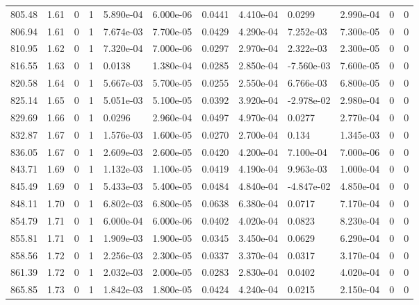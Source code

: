 \documentclass[preview]{standalone}
\begin{document}
{{{{{{{{{{{{{{{{{{\begin{tabular}{L{1.2cm}C{1.2cm} C{0.3cm}C{0.5cm} C{1.4cm}C{1.4cm} C{1.4cm}C{1.4cm} C{1.6cm}C{1.6cm} C{1.6cm}C{1.6cm}}
  805.48  &  1.61  & 0     &  1 &  5.890e-04  & 6.000e-06  &  0.0441&   4.410e-04& 0.0299 & 2.990e-04   &  0 & 0  \\ 
  806.94  &  1.61  & 0     &  1 &  7.674e-03  & 7.700e-05  &  0.0429&   4.290e-04& 7.252e-03 & 7.300e-05   &  0 & 0  \\ 
  810.95  &  1.62  & 0     &  1 &  7.320e-04  & 7.000e-06  &  0.0297&   2.970e-04& 2.322e-03 & 2.300e-05   &  0 & 0  \\ 
  816.55  &  1.63  & 0     &  1 &  0.0138  & 1.380e-04  &  0.0285&   2.850e-04& -7.560e-03 & 7.600e-05   &  0 & 0  \\ 
  820.58  &  1.64  & 0     &  1 &  5.667e-03  & 5.700e-05  &  0.0255&   2.550e-04& 6.766e-03 & 6.800e-05   &  0 & 0  \\ 
  825.14  &  1.65  & 0     &  1 &  5.051e-03  & 5.100e-05  &  0.0392&   3.920e-04& -2.978e-02 & 2.980e-04   &  0 & 0  \\ 
  829.69  &  1.66  & 0     &  1 &  0.0296  & 2.960e-04  &  0.0497&   4.970e-04& 0.0277 & 2.770e-04   &  0 & 0  \\ 
  832.87  &  1.67  & 0     &  1 &  1.576e-03  & 1.600e-05  &  0.0270&   2.700e-04& 0.134 & 1.345e-03   &  0 & 0  \\ 
  836.05  &  1.67  & 0     &  1 &  2.609e-03  & 2.600e-05  &  0.0420&   4.200e-04& 7.100e-04 & 7.000e-06   &  0 & 0  \\ 
  843.71  &  1.69  & 0     &  1 &  1.132e-03  & 1.100e-05  &  0.0419&   4.190e-04& 9.963e-03 & 1.000e-04   &  0 & 0  \\ 
  845.49  &  1.69  & 0     &  1 &  5.433e-03  & 5.400e-05  &  0.0484&   4.840e-04& -4.847e-02 & 4.850e-04   &  0 & 0  \\ 
  848.11  &  1.70  & 0     &  1 &  6.802e-03  & 6.800e-05  &  0.0638&   6.380e-04& 0.0717 & 7.170e-04   &  0 & 0  \\ 
  854.79  &  1.71  & 0     &  1 &  6.000e-04  & 6.000e-06  &  0.0402&   4.020e-04& 0.0823 & 8.230e-04   &  0 & 0  \\ 
  855.81  &  1.71  & 0     &  1 &  1.909e-03  & 1.900e-05  &  0.0345&   3.450e-04& 0.0629 & 6.290e-04   &  0 & 0  \\ 
  858.56  &  1.72  & 0     &  1 &  2.256e-03  & 2.300e-05  &  0.0337&   3.370e-04& 0.0317 & 3.170e-04   &  0 & 0  \\ 
  861.39  &  1.72  & 0     &  1 &  2.032e-03  & 2.000e-05  &  0.0283&   2.830e-04& 0.0402 & 4.020e-04   &  0 & 0  \\ 
  865.85  &  1.73  & 0     &  1 &  1.842e-03  & 1.800e-05  &  0.0424&   4.240e-04& 0.0215 & 2.150e-04   &  0 & 0  \\ 

\end{tabular}}}}}}}}}}}}}}}}}}}
\end{document}
